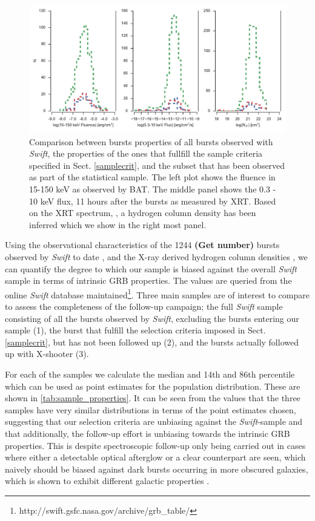 \documentclass{aa}    %
\newcommand\todo[1]{\textbf{(#1)}}
\begin{document}
\begin{figure}
	\centerline{\includegraphics[width=18cm]{figures/completeness_BAT.pdf}}
	\caption{Comparison between bursts properties of all bursts observed with
	\textit{Swift}, the properties of the ones that fullfill the sample criteria
	specified in Sect. \ref{samplecrit}, and the subset that has been observed as
	part of the statistical sample. The left plot shows the fluence in 15-150 keV
	as observed by BAT. The middle panel shows the 0.3 - 10 keV flux, 11 hours
	after the bursts as measured by XRT. Based on the XRT spectrum,
	\citep{Evans2009}, a hydrogen column density has been inferred which we show in
	the right most panel.}
	\label{fig:swift_complete}
\end{figure}

Using the observational characteristics of the 1244 \todo{Get number} bursts
observed by \textit{Swift} to date \cite{Gehrels2009}, and the X-ray derived
hydrogen column densities \citep{Evans2009}, we can quantify the degree to which
our sample is biased against the overall \textit{Swift} sample in terms of
intrinsic GRB properties. The values are queried from the online \textit{Swift}
database maintained\footnote{http://swift.gsfc.nasa.gov/archive/grb\_table/}.
Three main samples are of interest to compare to assess the completeness of the
follow-up campaign; the full \textit{Swift} sample consisting of all the bursts
observed by \textit{Swift}, excluding the bursts entering our sample (1), the
burst that fulfill the selection criteria imposed in Sect. \ref{samplecrit}, but
has not been followed up (2), and the bursts actually followed up with X-shooter
(3).



For each of the samples we calculate the median and 14th and 86th percentile
which can be used as point estimates for the population distribution. These are
shown in \ref{tab:sample_properties}. It can be seen from the values that the
three samples have very similar distributions in terms of the point estimates
chosen, suggesting that our selection criteria are unbiasing against the
\textit{Swift}-sample and that additionally, the follow-up effort is unbiasing
towards the intrinsic GRB properties. This is despite spectroscopic follow-up
only being carried out in cases where either a detectable optical afterglow or a
clear counterpart are seen, which naively should be biased against dark bursts
occurring in more obscured galaxies, which is shown to exhibit different
galactic properties \citep{Perley2009, Kruhler2011, Rossi2012, Perley2013b,
	Perley2015b}.
\end{document}

